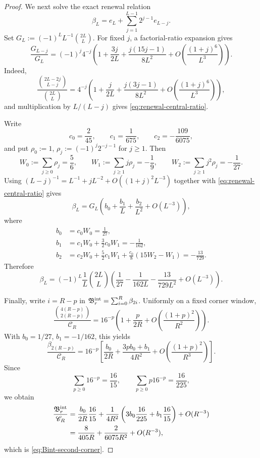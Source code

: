 \documentclass[11pt]{article}
\theoremstyle{definition}
\theoremstyle{remark}
\begin{document}
\begin{proof}
We next solve the exact renewal relation
\[
 \beta_L=e_L+\sum_{j=1}^{L-1}2^{j-1}e_{L-j}.
\]
Set \(G_L:=(-1)^LL^{-1}\binom{2L}{L}\).  For fixed \(j\), a
factorial-ratio expansion gives
\begin{equation}
 \frac{G_{L-j}}{G_L}
 =(-1)^j4^{-j}
 \left(1+\frac{3j}{2L}
 +\frac{j(15j-1)}{8L^2}
 +O\!\left(\frac{(1+j)^6}{L^3}\right)\right).
 \label{eq:renewal-central-ratio}
\end{equation}
Indeed,
\[
 \frac{\binom{2L-2j}{L-j}}{\binom{2L}{L}}
 =4^{-j}\left(1+\frac{j}{2L}
 +\frac{j(3j-1)}{8L^2}
 +O\!\left(\frac{(1+j)^6}{L^3}\right)\right),
\]
and multiplication by \(L/(L-j)\) gives
\eqref{eq:renewal-central-ratio}.

Write
\[
 c_0=\frac2{45},\qquad c_1=\frac1{675},\qquad
 c_2=-\frac{109}{6075},
\]
and put \(\rho_0:=1\),
\(\rho_j:=(-1)^j2^{-j-1}\) for \(j\ge1\).  Then
\begin{equation}
 W_0:=\sum_{j\ge0}\rho_j=\frac56,
 \qquad
 W_1:=\sum_{j\ge1}j\rho_j=-\frac19,
 \qquad
 W_2:=\sum_{j\ge1}j^2\rho_j=-\frac1{27}.
 \label{eq:renewal-weight-moments}
\end{equation}
Using \((L-j)^{-1}=L^{-1}+jL^{-2}+O((1+j)^2L^{-3})\)
together with \eqref{eq:renewal-central-ratio} gives
\[
 \beta_L=G_L\left(b_0+\frac{b_1}{L}+\frac{b_2}{L^2}
 +O(L^{-3})\right),
\]
where
\begin{align*}
 b_0&=c_0W_0=\frac1{27},\\
 b_1&=c_1W_0+\frac32c_0W_1=-\frac1{162},\\
 b_2&=c_2W_0+\frac52c_1W_1
 +\frac{c_0}{8}(15W_2-W_1)=-\frac{13}{729}.
\end{align*}
Therefore
\begin{equation}
 {
 \beta_L=(-1)^L\frac1L\binom{2L}{L}
 \left(
 \frac1{27}-\frac1{162L}-\frac{13}{729L^2}
 +O(L^{-3})\right).}
 \label{eq:betaL-second}
\end{equation}

Finally, write \(i=R-p\) in
\(\mathfrak B_r^{\rm int}=\sum_{i=0}^{R}\beta_{2i}\).  Uniformly on a
fixed corner window,
\[
 \frac{\binom{4(R-p)}{2(R-p)}}{\mathscr C_R}
 =16^{-p}\left(1+\frac{p}{2R}
 +O\!\left(\frac{(1+p)^2}{R^2}\right)\right).
\]
With \(b_0=1/27\), \(b_1=-1/162\), this yields
\[
 \frac{\beta_{2(R-p)}}{\mathscr C_R}
 =16^{-p}\left[
 \frac{b_0}{2R}+\frac{3pb_0+b_1}{4R^2}
 +O\!\left(\frac{(1+p)^2}{R^3}\right)\right].
\]
Since
\[
 \sum_{p\ge0}16^{-p}=\frac{16}{15},
 \qquad
 \sum_{p\ge0}p16^{-p}=\frac{16}{225},
\]
we obtain
\begin{align*}
 \frac{\mathfrak B_r^{\rm int}}{\mathscr C_R}
 &=\frac{b_0}{2R}\frac{16}{15}
 +\frac1{4R^2}\left(
 3b_0\frac{16}{225}+b_1\frac{16}{15}\right)
 +O(R^{-3})\\
 &=\frac{8}{405R}+\frac{2}{6075R^2}+O(R^{-3}),
\end{align*}
which is \eqref{eq:Bint-second-corner}.


\end{proof}
\end{document}
